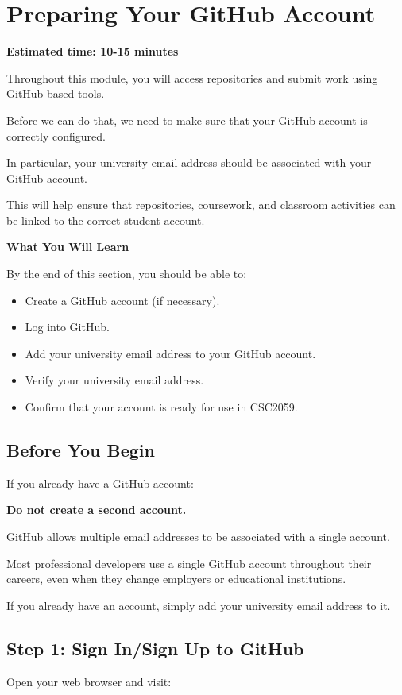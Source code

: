 \documentclass{csc2059practical}
\begin{document}
\clearpage
\section{Preparing Your GitHub Account}
\begin{infobox}
\textbf{Estimated time: 10-15 minutes}
\end{infobox}
Throughout this module, you will access repositories and submit work using GitHub-based tools.

Before we can do that, we need to make sure that your GitHub account is correctly configured.

In particular, your university email address should be associated with your GitHub account.

This will help ensure that repositories, coursework, and classroom activities can be linked to the correct student account.

\begin{learningoutcomes}
\textbf{What You Will Learn}\par
\medskip
By the end of this section, you should be able to:

\begin{itemize}
  \item Create a GitHub account (if necessary).
  \item Log into GitHub.
  \item Add your university email address to your GitHub account.
  \item Verify your university email address.
  \item Confirm that your account is ready for use in CSC2059.
\end{itemize}
\end{learningoutcomes}
\subsection{Before You Begin}
If you already have a GitHub account:

\textbf{Do not create a second account.}

GitHub allows multiple email addresses to be associated with a single account.

Most professional developers use a single GitHub account throughout their careers, even when they change employers or educational institutions.

If you already have an account, simply add your university email address to it.

\subsection{Step 1: Sign In/Sign Up to GitHub}
Open your web browser and visit:
\end{document}
